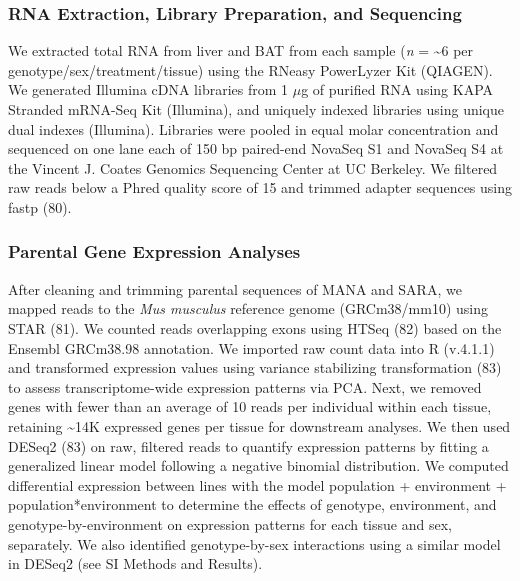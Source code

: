 \documentclass[9pt,twocolumn,twoside,lineno]{pnas-new}
\begin{document}
\hypertarget{rna-extraction-library-preparation-and-sequencing}{%
\subsubsection*{RNA Extraction, Library Preparation, and
Sequencing}\label{rna-extraction-library-preparation-and-sequencing}}

We extracted total RNA from liver and BAT from each sample (\emph{n} =
\textasciitilde6 per genotype/sex/treatment/tissue) using the RNeasy
PowerLyzer Kit (QIAGEN). We generated Illumina cDNA libraries from 1
\(\mu\)g of purified RNA using KAPA Stranded mRNA-Seq Kit (Illumina),
and uniquely indexed libraries using unique dual indexes (Illumina).
Libraries were pooled in equal molar concentration and sequenced on one
lane each of 150 bp paired-end NovaSeq S1 and NovaSeq S4 at the Vincent
J. Coates Genomics Sequencing Center at UC Berkeley. We filtered raw
reads below a Phred quality score of 15 and trimmed adapter sequences
using fastp (80).

\hypertarget{parental-gene-expression-analyses}{%
\subsubsection*{Parental Gene Expression
Analyses}\label{parental-gene-expression-analyses}}

After cleaning and trimming parental sequences of MANA and SARA, we
mapped reads to the \emph{Mus musculus} reference genome (GRCm38/mm10)
using STAR (81). We counted reads overlapping exons using HTSeq (82)
based on the Ensembl GRCm38.98 annotation. We imported raw count data
into R (v.4.1.1) and transformed expression values using variance
stabilizing transformation (83) to assess transcriptome-wide expression
patterns via PCA. Next, we removed genes with fewer than an average of
10 reads per individual within each tissue, retaining \textasciitilde14K
expressed genes per tissue for downstream analyses. We then used DESeq2
(83) on raw, filtered reads to quantify expression patterns by fitting a
generalized linear model following a negative binomial distribution. We
computed differential expression between lines with the model population
+ environment + population*environment to determine the effects of
genotype, environment, and genotype-by-environment on expression
patterns for each tissue and sex, separately. We also identified
genotype-by-sex interactions using a similar model in DESeq2 (see SI
Methods and Results).
\end{document}
